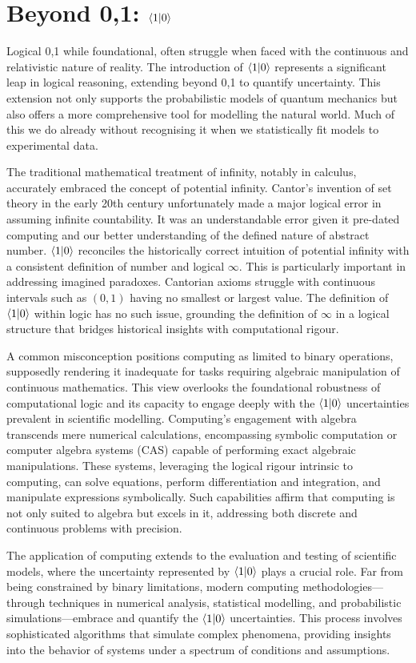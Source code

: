 \documentclass[12pt]{article}
\begin{document}
\section*{Beyond {0,1}: \(\langle 1 | 0 \rangle\)}
Logical {0,1} while foundational, often struggle when faced with the continuous and relativistic nature of reality. The introduction of \(\langle 1 | 0 \rangle\) represents a significant leap in logical reasoning, extending beyond {0,1} to quantify uncertainty. This extension not only supports the probabilistic models of quantum mechanics but also offers a more comprehensive tool for modelling the natural world. Much of this we do already without recognising it when we statistically fit models to experimental data.

The traditional mathematical treatment of infinity, notably in calculus, accurately embraced the concept of potential infinity. Cantor's invention of set theory in the early 20th century unfortunately made a major logical error in assuming infinite countability. It was an understandable error given it pre-dated computing and our better understanding of the defined nature of abstract number. \(\langle 1 | 0 \rangle\) reconciles the historically correct intuition of potential infinity with a consistent definition of number and logical \(\infty\). This is particularly important in addressing imagined paradoxes. Cantorian axioms struggle with continuous intervals such as \((0,1)\) having no smallest or largest value. The definition of \(\langle 1 | 0 \rangle\) within logic has no such issue, grounding the definition of \(\infty\) in a logical structure that bridges historical insights with computational rigour.

A common misconception positions computing as limited to binary operations, supposedly rendering it inadequate for tasks requiring algebraic manipulation of continuous mathematics. This view overlooks the foundational robustness of computational logic and its capacity to engage deeply with the \(\langle 1 | 0 \rangle\) uncertainties prevalent in scientific modelling. Computing's engagement with algebra transcends mere numerical calculations, encompassing symbolic computation or computer algebra systems (CAS) capable of performing exact algebraic manipulations. These systems, leveraging the logical rigour intrinsic to computing, can solve equations, perform differentiation and integration, and manipulate expressions symbolically. Such capabilities affirm that computing is not only suited to algebra but excels in it, addressing both discrete and continuous problems with precision.

The application of computing extends to the evaluation and testing of scientific models, where the uncertainty represented by \(\langle 1 | 0 \rangle\) plays a crucial role. Far from being constrained by binary limitations, modern computing methodologies—through techniques in numerical analysis, statistical modelling, and probabilistic simulations—embrace and quantify the \(\langle 1 | 0 \rangle\) uncertainties. This process involves sophisticated algorithms that simulate complex phenomena, providing insights into the behavior of systems under a spectrum of conditions and assumptions.
\end{document}
